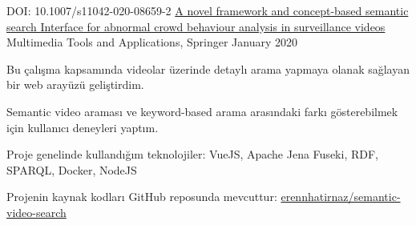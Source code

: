 
\begin{cventries}
  \cventry
    {DOI: 10.1007/s11042-020-08659-2} %
    {\href{https://doi.org/10.1007/s11042-020-08659-2}{A novel framework and concept-based semantic search Interface for abnormal crowd behaviour analysis in surveillance videos}} %
    {Multimedia Tools and Applications, Springer} %
    {January 2020} %
    {
      \begin{cvitems} %
        \item {Bu çalışma kapsamında videolar üzerinde detaylı arama yapmaya olanak sağlayan bir web arayüzü geliştirdim.}
		    \item {Semantic video araması ve keyword-based arama arasındaki farkı gösterebilmek için kullanıcı deneyleri yaptım.}
        \item {Proje genelinde kullandığım teknolojiler: VueJS, Apache Jena Fuseki, RDF, SPARQL, Docker, NodeJS}
        \item {Projenin kaynak kodları GitHub reposunda mevcuttur: \href{https://github.com/erenhatirnaz/semantic-video-search}{erennhatirnaz/semantic-video-search}}
      \end{cvitems}
    }

\end{cventries}
